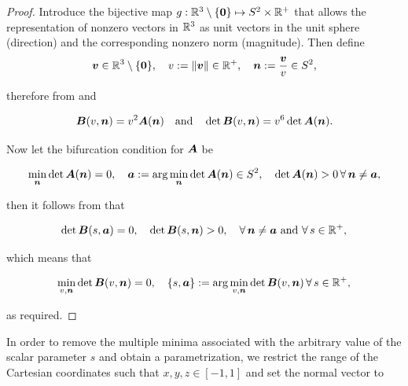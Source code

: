 \documentclass[12pt]{article}
\numberwithin{equation}{section}
\begin{document}
\begin{proof}
  Introduce the bijective map $g : \mathbb{R}^3 \setminus \{\mathbf{0}\}
  \mapsto S^2 \times \mathbb{R}^+$ that allows the representation of
  nonzero vectors in $\mathbb{R}^3$ as unit vectors in the unit sphere
  (direction) and the corresponding nonzero norm (magnitude). Then
  define
  \begin{equation}
    {\boldsymbol{v}} \in \mathbb{R}^3 \setminus \{\mathbf{0}\},
    \quad
    v := \| {\boldsymbol{v}} \| \in \mathbb{R}^+,
    \quad
    {\boldsymbol{n}} := \frac{{\boldsymbol{v}}}{v} \in S^2,
  \end{equation}
  
  therefore from  and
  
  \begin{equation} \label{eq:Cartesian-from-acoustic}
      {\boldsymbol{B}}(v, {\boldsymbol{n}})
      =
      v^2 {\boldsymbol{A}}({\boldsymbol{n}})
      \quad \text{and} \quad
      \det {\boldsymbol{B}}(v, {\boldsymbol{n}}) = v^6 \det {\boldsymbol{A}}({\boldsymbol{n}}).
  \end{equation}
  
  Now let the bifurcation condition for ${\boldsymbol{A}}$ be
  
  \begin{equation}
    \min_{{\boldsymbol{n}}} \det {\boldsymbol{A}}({\boldsymbol{n}}) = 0,
    \quad
    {\boldsymbol{a}} := \arg \min_{{\boldsymbol{n}}} \det {\boldsymbol{A}}({\boldsymbol{n}}) \in S^2,
    \quad
    \det {\boldsymbol{A}}({\boldsymbol{n}}) > 0 \, \forall \, {\boldsymbol{n}} \neq {\boldsymbol{a}},
  \end{equation}
  
  then it follows from  that
  
  \begin{equation}
    \det {\boldsymbol{B}}(s, {\boldsymbol{a}}) = 0,
    \quad
    \det {\boldsymbol{B}}(s, {\boldsymbol{n}}) > 0,
    \quad \forall \, {\boldsymbol{n}} \neq {\boldsymbol{a}}
    \text{ and } \forall \, s \in \mathbb{R}^+,
  \end{equation}
  
  which means that
  
  \begin{equation}
    \min_{v, {\boldsymbol{n}}} \det {\boldsymbol{B}}(v, {\boldsymbol{n}}) = 0,
    \quad
    \{s, {\boldsymbol{a}}\} := \arg \min_{v, {\boldsymbol{n}}} \det {\boldsymbol{B}}(v, {\boldsymbol{n}})
    \,
    \forall \, s \in \mathbb{R}^+,
  \end{equation}
  
  as required.
\end{proof}

In order to remove the multiple minima associated with the arbitrary
value of the scalar parameter $s$ and obtain a parametrization, we
restrict the range of the Cartesian coordinates such that $x,y,z \in
[-1,1]$ and set the normal vector to
\end{document}
